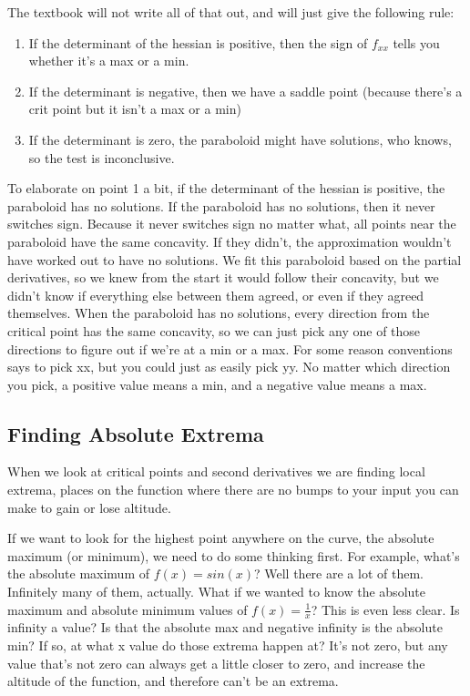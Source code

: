 \documentclass[12pt, letterpaper]{article}
\begin{document}
The textbook will not write all of that out, and will just give the following rule:
\begin{enumerate}
    \item If the determinant of the hessian is positive, then the sign of $f_{xx}$ tells you whether it's a max or a min.
    \item If the determinant is negative, then we have a saddle point (because there's a crit point but it isn't a max or a min)
    \item If the determinant is zero, the paraboloid might have solutions, who knows, so the test is inconclusive.
\end{enumerate}
To elaborate on point 1 a bit, if the determinant of the hessian is positive, the paraboloid has no solutions. 
If the paraboloid has no solutions, then it never switches sign. 
Because it never switches sign no matter what, all points near the paraboloid have the same concavity.
If they didn't, the approximation wouldn't have worked out to have no solutions.
We fit this paraboloid based on the partial derivatives, so we knew from the start it would follow their concavity, but we didn't know if everything else between them agreed, or even if they agreed themselves.
When the paraboloid has no solutions, every direction from the critical point has the same concavity, so we can just pick any one of those directions to figure out if we're at a min or a max.
For some reason conventions says to pick xx, but you could just as easily pick yy.
No matter which direction you pick, a positive value means a min, and a negative value means a max.
\subsection{Finding Absolute Extrema}
When we look at critical points and second derivatives we are finding local extrema, places on the function where there are no bumps to your input you can make to gain or lose altitude.

If we want to look for the highest point anywhere on the curve, the absolute maximum (or minimum), we need to do some thinking first.
For example, what's the absolute maximum of $f(x) = sin(x)$? Well there are a lot of them. Infinitely many of them, actually.
What if we wanted to know the absolute maximum and absolute minimum values of $f(x) = \frac{1}{x}$? This is even less clear.
Is infinity a value? Is that the absolute max and negative infinity is the absolute min? If so, at what x value do those extrema happen at?
It's not zero, but any value that's not zero can always get a little closer to zero, and increase the altitude of the function, and therefore can't be an extrema.
\end{document}
